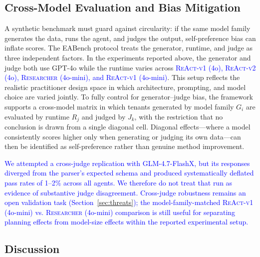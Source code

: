 \documentclass[journal,dvipsnames]{acmart}
\begin{document}




\subsection{Cross-Model Evaluation and Bias Mitigation}
\label{sec:cross-model}

A synthetic benchmark must guard against circularity: if the same model family generates the data, runs the agent, and judges the output, self-preference bias can inflate scores. The EABench protocol treats the generator, runtime, and judge as three independent factors. In the experiments reported above, the generator and judge both use GPT-4o while the runtime varies across \textcolor{blue}{\textsc{ReAct-v1} (4o), \textsc{ReAct-v2} (4o), \textsc{Researcher} (4o-mini), and \textsc{ReAct-v1} (4o-mini)}. This setup reflects the realistic practitioner design space in which architecture, prompting, and model choice are varied jointly. To fully control for generator--judge bias, the framework supports a cross-model matrix in which tenants generated by model family $G_i$ are evaluated by runtime $R_j$ and judged by $J_k$, with the restriction that no conclusion is drawn from a single diagonal cell. Diagonal effects---where a model consistently scores higher only when generating or judging its own data---can then be identified as self-preference rather than genuine method improvement.

\textcolor{blue}{We attempted a cross-judge replication with GLM-4.7-FlashX, but its responses diverged from the parser's expected schema and produced systematically deflated pass rates of 1--2\% across all agents. We therefore do not treat that run as evidence of substantive judge disagreement. Cross-judge robustness remains an open validation task (Section~\ref{sec:threats}); the model-family-matched \textsc{ReAct-v1} (4o-mini) vs. \textsc{Researcher} (4o-mini) comparison is still useful for separating planning effects from model-size effects within the reported experimental setup.}

\subsection{Discussion}
\label{sec:exp-discussion}
\end{document}
